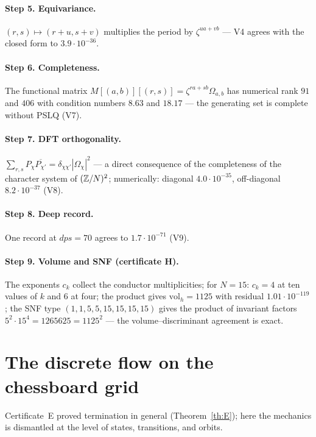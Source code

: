 \paragraph{Step 5. Equivariance.} $(r,s)\mapsto(r+u,s+v)$ multiplies
the period by $\zeta^{ua+vb}$ --- V4 agrees with the closed form to
$3.9\cdot10^{-36}$.

\paragraph{Step 6. Completeness.} The functional matrix
$M[(a,b)][(r,s)]=\zeta^{ra+sb}\Omega_{a,b}$ has numerical rank $91$
and $406$ with condition numbers $8.63$ and $18.17$ --- the
generating set is complete without PSLQ (V7).

\paragraph{Step 7. DFT orthogonality.}
$\sum_{r,s}P_\chi\overline{P_{\chi'}}=\delta_{\chi\chi'}
|\Omega_\chi|^2$ --- a direct consequence of the completeness of the
character system of $(\mathbb{Z}/N)^2$; numerically: diagonal
$4.0\cdot10^{-35}$, off-diagonal $8.2\cdot10^{-37}$ (V8).

\paragraph{Step 8. Deep record.} One record at $dps=70$ agrees to
$1.7\cdot10^{-71}$ (V9).

\paragraph{Step 9. Volume and SNF (certificate H).} The exponents
$c_k$ collect the conductor multiplicities; for $N=15$: $c_k=4$ at
ten values of $k$ and $6$ at four; the product gives
$\mathrm{vol}_h=1125$ with residual $1.01\cdot10^{-119}$; the SNF
type $(1,1,5,5,15,15,15,15)$ gives the product of invariant factors
$5^2\cdot15^4=1265625=1125^2$ --- the volume--discriminant agreement
is exact.

\section{The discrete flow on the chessboard grid}\label{sec:flow}

Certificate~E proved termination in general (Theorem~\ref{th:E});
here the mechanics is dismantled at the level of states, transitions,
and orbits.

